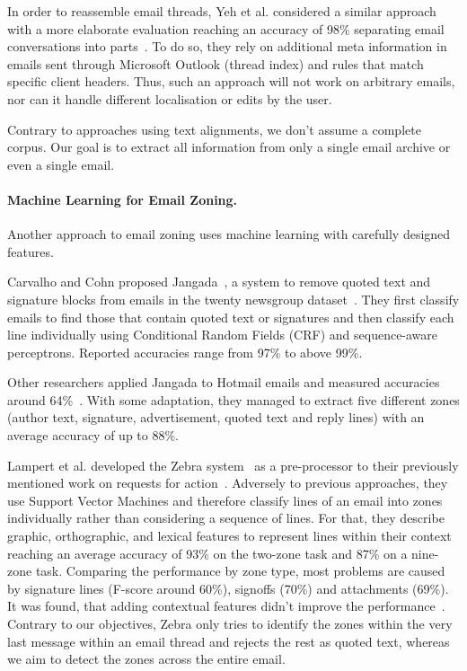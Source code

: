 \documentclass{llncs}
\begin{document}
In order to reassemble email threads, Yeh et al. considered a similar approach with a more elaborate evaluation reaching an accuracy of 98\% separating email conversations into parts~\cite{similarity}.
To do so, they rely on additional meta information in emails sent through Microsoft Outlook (thread index) and rules that match specific client headers.
Thus, such an approach will not work on arbitrary emails, nor can it handle different localisation or edits by the user.

Contrary to approaches using text alignments, we don't assume a complete corpus.
Our goal is to extract all information from only a single email archive or even a single email.

\paragraph{Machine Learning for Email Zoning.}
Another approach to email zoning uses machine learning with carefully designed features.

Carvalho and Cohn proposed Jangada~\cite{signature}, a system to remove quoted text and signature blocks from emails in the twenty newsgroup dataset~\cite{20news}.
They first classify emails to find those that contain quoted text or signatures and then classify each line individually using Conditional Random Fields (CRF) and sequence-aware perceptrons.
Reported accuracies range from 97\% to above 99\%.

Other researchers applied Jangada to Hotmail emails and measured accuracies around 64\%~\cite{profiling}.
With some adaptation, they managed to extract five different zones (author text, signature, advertisement, quoted text and reply lines) with an average accuracy of up to 88\%.

Lampert et al. developed the Zebra system~\cite{zones} as a pre-processor to their previously mentioned work on requests for action~\cite{rfa}.
Adversely to previous approaches, they use Support Vector Machines and therefore classify lines of an email into zones individually rather than considering a sequence of lines.
For that, they describe graphic, orthographic, and lexical features to represent lines within their context reaching an average accuracy of 93\% on the two-zone task and 87\% on a nine-zone task.
Comparing the performance by zone type, most problems are caused by signature lines (F-score around 60\%), signoffs (70\%) and attachments (69\%).
It was found, that adding contextual features didn't improve the performance~\cite{zones}.
Contrary to our objectives, Zebra only tries to identify the zones within the very last message within an email thread and rejects the rest as quoted text, whereas we aim to detect the zones across the entire email.
\end{document}
